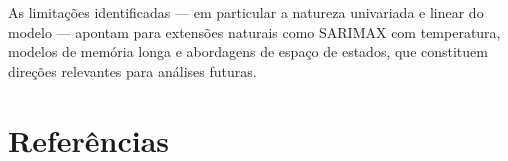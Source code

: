 \documentclass[12pt, a4paper]{article}
\begin{document}
As limitações identificadas --- em particular a natureza univariada e linear do
modelo --- apontam para extensões naturais como SARIMAX com temperatura, modelos de
memória longa e abordagens de espaço de estados, que constituem direções relevantes
para análises futuras.

\section*{Referências}
\printbibliography[heading=none]
\end{document}
